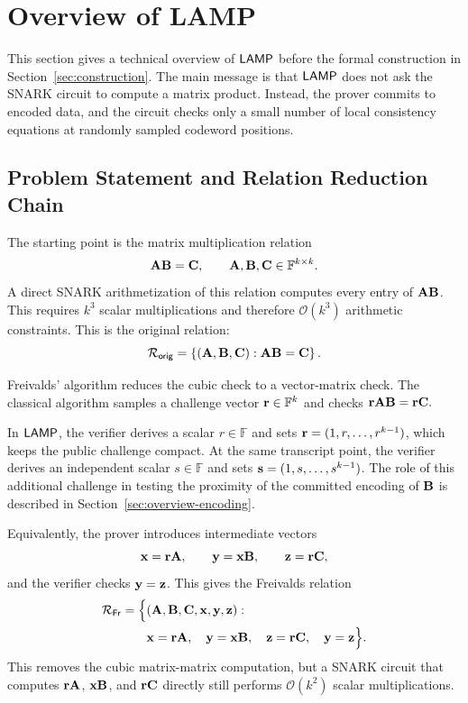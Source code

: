 \section{Overview of LAMP}
\label{sec:tech-overview}

This section gives a technical overview of \(\textsf{LAMP}\) before the formal
construction in Section~\ref{sec:construction}.  The main message is that
\(\textsf{LAMP}\) does not ask the SNARK circuit to compute a matrix product.
Instead, the prover commits to encoded data, and the circuit checks only a
small number of local consistency equations at randomly sampled codeword
positions.

\subsection{Problem Statement and Relation Reduction Chain}
\label{sec:overview-reduction-chain}

The starting point is the matrix multiplication relation
\[
  \mathbf{A}\mathbf{B}=\mathbf{C},
  \qquad
  \mathbf{A},\mathbf{B},\mathbf{C}\in\mathbb{F}^{k\times k}.
\]
A direct SNARK arithmetization of this relation computes every entry of
\(\mathbf{A}\mathbf{B}\).  This requires \(k^3\) scalar multiplications and therefore
\(\mathcal{O}(k^3)\) arithmetic constraints.  This is the original relation:
\[
{\mathcal{R}}_{\mathsf{orig}}
=
\left\{
(\mathbf{A},\mathbf{B},\mathbf{C}) :
\mathbf{A}\mathbf{B}=\mathbf{C}
\right\}.
\]

Freivalds' algorithm reduces the cubic check to a vector-matrix check.  The
classical algorithm samples a challenge vector \(\mathbf{r}\in\mathbb{F}^k\) and checks
  $\mathbf{r}\mathbf{A}\mathbf{B}
  =
  \mathbf{r}\mathbf{C}.$
  
\begin{revblock}
  In \(\textsf{LAMP}\), the verifier derives a scalar \(r\in\mathbb{F}\) and
sets $\mathbf{r}=(1,r,\ldots,r^{k-1})$,
which keeps the public challenge compact.
  At the same transcript point, the verifier derives an independent scalar
\(s\in\mathbb{F}\) and sets $\mathbf{s}=(1,s,\ldots,s^{k-1})$. 
The role of this additional challenge in testing the proximity of the
committed encoding of $\mathbf{B}$ is described in Section~\ref{sec:overview-encoding}.
\end{revblock}
Equivalently, the prover introduces intermediate vectors
\[
  \mathbf{x}=\mathbf{r}\mathbf{A},
  \qquad
  \mathbf{y}=\mathbf{x}\mathbf{B},
  \qquad
  \mathbf{z}=\mathbf{r}\mathbf{C},
\]
and the verifier checks \(\mathbf{y}=\mathbf{z}\).  This gives the Freivalds
relation
\[
\begin{aligned}
{\mathcal{R}}_{\mathsf{Fr}}
=
\Big\{
&(\mathbf{A},\mathbf{B},\mathbf{C},\mathbf{x},\mathbf{y},\mathbf{z}) :
\\
&\mathbf{x}=\mathbf{r}\mathbf{A},\quad
  \mathbf{y}=\mathbf{x}\mathbf{B},\quad
  \mathbf{z}=\mathbf{r}\mathbf{C},\quad
  \mathbf{y}=\mathbf{z}
\Big\}.
\end{aligned}
\]
This removes the cubic matrix-matrix computation, but a SNARK circuit that
computes \(\mathbf{r}\mathbf{A}\), \(\mathbf{x}\mathbf{B}\), and \(\mathbf{r}\mathbf{C}\)
directly still performs \(\mathcal{O}(k^2)\) scalar multiplications.

